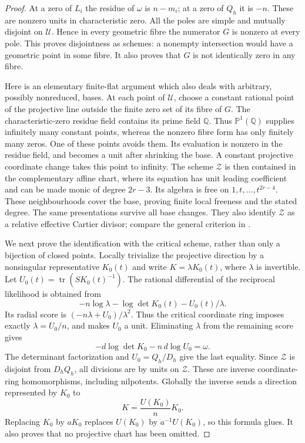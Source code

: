 \begin{proof}
At a zero of \(L_i\) the residue of \(\omega\) is \(n-m_i\);
at a zero of \(Q_h\) it is \(-n\).  These are nonzero units in
characteristic zero.  All the poles are simple and mutually disjoint
on \(\mathscr U\).  Hence in every geometric fibre the numerator
\(G\) is nonzero at every pole.  This proves disjointness as schemes:
a nonempty intersection would have a geometric point in some fibre.
It also proves that \(G\) is not identically zero in any fibre.

Here is an elementary finite-flat argument which also deals with
arbitrary, possibly nonreduced, bases.  At each point of
\(\mathscr U\), choose a constant rational point of the projective
line outside the finite zero set of its fibre of \(G\).  The
characteristic-zero residue field contains its prime field \(\mathbb Q\).
Thus \(\mathbb P^1(\mathbb Q)\) supplies infinitely many constant
points, whereas the nonzero fibre form has only finitely many zeros.
One of these points avoids them.  Its evaluation is nonzero in the
residue field, and becomes a unit after shrinking the base.
A constant projective coordinate change takes this point to infinity.
The scheme \(\mathscr Z\) is then contained in the complementary
affine chart, where its equation has unit leading coefficient and
can be made monic of degree \(2r-3\).  Its algebra is free on
\(1,t,\ldots,t^{2r-4}\).  These neighbourhoods cover the base,
proving finite local freeness and the stated degree.  The same
presentations survive all base changes.  They also identify
\(\mathscr Z\) as a relative effective Cartier divisor; compare
the general criterion in \cite[Tag~062Y]{StacksCritical144}.

We next prove the identification with the critical scheme, rather
than only a bijection of closed points.  Locally trivialize the
projective direction by a nonsingular representative \(K_0(t)\)
and write \(K=\lambda K_0(t)\), where \(\lambda\) is invertible.
Let \(U_0(t)=\operatorname{tr}(S K_0(t)^{-1})\).  The rational
differential of the reciprocal likelihood is obtained from
\[
 -n\log\lambda-\log\det K_0(t)-U_0(t)/\lambda.
\]
Its radial score is \((-n\lambda+U_0)/\lambda^2\).  Thus the
critical coordinate ring imposes exactly
\(\lambda=U_0/n\), and makes \(U_0\) a unit.  Eliminating
\(\lambda\) from the remaining score gives
\[
             -d\log\det K_0-n\,d\log U_0=\omega.
\]
The determinant factorization and \(U_0=Q_h/D_h\) give the
last equality.  Since \(\mathscr Z\) is disjoint from \(D_hQ_h\),
all divisions are by units on \(\mathscr Z\).  These are inverse
coordinate-ring homomorphisms, including nilpotents.  Globally the
inverse sends a direction represented by \(K_0\) to
\begin{equation}\label{eq:radial-reconstruction-v144}
                         K=\frac{U(K_0)}{n}K_0.
\end{equation}
Replacing \(K_0\) by \(aK_0\) replaces \(U(K_0)\) by
\(a^{-1}U(K_0)\), so this formula glues.  It also proves that no
projective chart has been omitted.


\end{proof}
